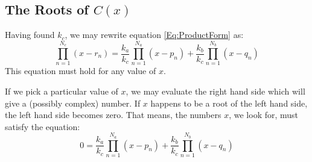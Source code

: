 \subsection{The Roots of $C(x)$}
Having found $k_c$, we may rewrite equation \ref{Eq:ProductForm} as:
\begin{equation}
\label{Eq:ProductCondition}
  \prod_{n=1}^{N_c} (x - r_n) = \frac{k_a}{k_c} \prod_{n=1}^{N_a} (x - p_n) + \frac{k_b}{k_c} \prod_{n=1}^{N_b} (x - q_n)
\end{equation}
This equation must hold for any value of $x$. 




If we pick a particular value of $x$, we may evaluate the right hand side which will give a (possibly complex) number. If $x$ happens to be a root of the left hand side, the left hand side becomes zero. That means, the numbers $x$, we look for, must satisfy the equation:
\begin{equation}
\label{Eq:RootCondition}
  0 = \frac{k_a}{k_c} \prod_{n=1}^{N_a} (x - p_n) + \frac{k_b}{k_c} \prod_{n=1}^{N_b} (x - q_n)
\end{equation}




